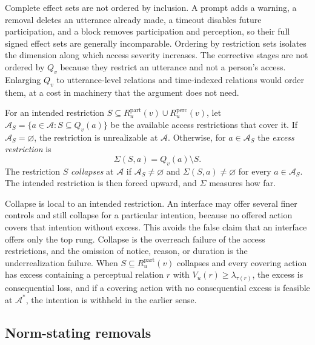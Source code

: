 \begin{remark}
Complete effect sets are not ordered by inclusion. A prompt adds a warning, a removal deletes an utterance already made, a timeout disables future participation, and a block removes participation and perception, so their full signed effect sets are generally incomparable. Ordering by restriction sets isolates the dimension along which access severity increases. The corrective stages are not ordered by $Q_v$ because they restrict an utterance and not a person's access. Enlarging $Q_v$ to utterance-level relations and time-indexed relations would order them, at a cost in machinery that the argument does not need.
\end{remark}

\begin{definition}
For an intended restriction $S\subseteq R_u^{\mathrm{part}}(v)\cup R_u^{\mathrm{perc}}(v)$, let $\mathcal{A}_S=\{a\in\mathcal{A} : S\subseteq Q_v(a)\}$ be the available access restrictions that cover it. If $\mathcal{A}_S=\varnothing$, the restriction is unrealizable at $\mathcal{A}$. Otherwise, for $a\in\mathcal{A}_S$ the \emph{excess restriction} is
\[
\Sigma(S,a)=Q_v(a)\setminus S .
\]
The restriction $S$ \emph{collapses} at $\mathcal{A}$ if $\mathcal{A}_S\neq\varnothing$ and $\Sigma(S,a)\neq\varnothing$ for every $a\in\mathcal{A}_S$. The intended restriction is then forced upward, and $\Sigma$ measures how far.
\end{definition}

\begin{remark}
Collapse is local to an intended restriction. An interface may offer several finer controls and still collapse for a particular intention, because no offered action covers that intention without excess. This avoids the false claim that an interface offers only the top rung. Collapse is the overreach failure of the access restrictions, and the omission of notice, reason, or duration is the underrealization failure. When $S\subseteq R_u^{\mathrm{part}}(v)$ collapses and every covering action has excess containing a perceptual relation $r$ with $V_u(r)\ge\lambda_{\tau(r)}$, the excess is consequential loss, and if a covering action with no consequential excess is feasible at $\mathcal{A}^{*}$, the intention is withheld in the earlier sense.
\end{remark}

\subsection{Norm-stating removals}

